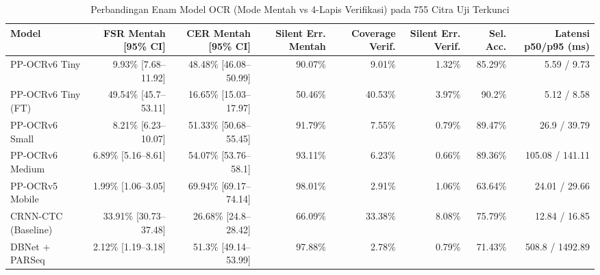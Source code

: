 \begin{table}[htbp]
\centering
\caption{Perbandingan Enam Model OCR (Mode Mentah vs 4-Lapis Verifikasi) pada 755 Citra Uji Terkunci}
\label{tab:tahap_a_komparasi}
\begin{tabular}{lrrrrrrr}
\hline
Model & FSR Mentah [95\% CI] & CER Mentah [95\% CI] & Silent Err. Mentah & Coverage Verif. & Silent Err. Verif. & Sel. Acc. & Latensi p50/p95 (ms) \\
\hline
PP-OCRv6 Tiny & 9.93\% [7.68–11.92] & 48.48\% [46.08–50.99] & 90.07\% & 9.01\% & 1.32\% & 85.29\% & 5.59 / 9.73 \\
PP-OCRv6 Tiny (FT) & 49.54\% [45.7–53.11] & 16.65\% [15.03–17.97] & 50.46\% & 40.53\% & 3.97\% & 90.2\% & 5.12 / 8.58 \\
PP-OCRv6 Small & 8.21\% [6.23–10.07] & 51.33\% [50.68–55.45] & 91.79\% & 7.55\% & 0.79\% & 89.47\% & 26.9 / 39.79 \\
PP-OCRv6 Medium & 6.89\% [5.16–8.61] & 54.07\% [53.76–58.1] & 93.11\% & 6.23\% & 0.66\% & 89.36\% & 105.08 / 141.11 \\
PP-OCRv5 Mobile & 1.99\% [1.06–3.05] & 69.94\% [69.17–74.14] & 98.01\% & 2.91\% & 1.06\% & 63.64\% & 24.01 / 29.66 \\
CRNN-CTC (Baseline) & 33.91\% [30.73–37.48] & 26.68\% [24.8–28.42] & 66.09\% & 33.38\% & 8.08\% & 75.79\% & 12.84 / 16.85 \\
DBNet + PARSeq & 2.12\% [1.19–3.18] & 51.3\% [49.14–53.99] & 97.88\% & 2.78\% & 0.79\% & 71.43\% & 508.8 / 1492.89 \\
\hline
\end{tabular}
\end{table}
